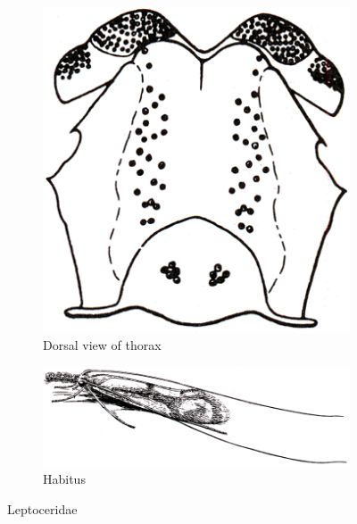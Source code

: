 \documentclass[letterpaper, 11pt]{article}
\begin{document}
\begin{figure}[ht!]
    \centering
        \begin{subfigure}[ht!]{0.25\textwidth}
        \includegraphics[width=\textwidth]{TrichoImage07}
        \caption{Dorsal view of thorax \citep[][Fig. 82]{bhl50956}}
        \label{fig:lepto2}
    \end{subfigure}
   \hfill %
        \begin{subfigure}[ht!]{0.68\textwidth}
        \includegraphics[width=\textwidth]{TrichoImage06}
        \caption{Habitus \citep[][Fig. 863]{bhl50956}}
        \label{fig:lepto1}
    \end{subfigure}
\caption{Leptoceridae}\label{fig:leptoc}
\end{figure}
\end{document}
